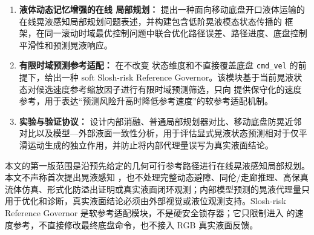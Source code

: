 \begin{enumerate}
  \item \textbf{液体动态记忆增强的在线 \MPCC{} 局部规划：} 提出一种面向移动底盘开口液体运输的在线晃液感知局部规划问题表述，并构建包含低阶晃液模态状态传播的 \MPCC{} 框架，在同一滚动时域最优控制问题中联合优化路径误差、路径进度、底盘控制平滑性和预测晃液响应。
  \item \textbf{有限时域预测参考适配：} 在不改变 \MPCC{} 状态维度和不直接覆盖底盘 \texttt{cmd\_vel} 的前提下，给出一种 soft Slosh-risk Reference Governor。该模块基于当前晃液状态对候选速度参考缩放因子进行有限时域预测筛选，只向 \MPCC{} 提供保守化的速度参考，用于表达“预测风险升高时降低参考速度”的软参考适配机制。
  \item \textbf{实验与验证协议：} 设计内部消融、普通局部规划器对比、移动底盘防晃近邻对比以及模型—外部液面一致性分析，用于评估显式晃液状态预测相对于仅平滑运动生成的独立作用，并防止将内部代理量误写为真实液面结论。
\end{enumerate}

本文的第一版范围是沿预先给定的几何可行参考路径进行在线晃液感知局部规划。本文不声称首次提出晃液感知 \MPC{}，也不处理完整动态避障、同伦/走廊推理、高保真流体仿真、形式化防溢出证明或真实液面闭环观测；内部模型预测的晃液代理量只用于优化和诊断，真实液面结论必须由外部视觉或液位观测支持。Slosh-risk Reference Governor 是软参考适配模块，不是硬安全锁存器；它只限制进入 \MPCC{} 的速度参考，不直接修改最终底盘命令，也不接入 RGB 真实液面反馈。
